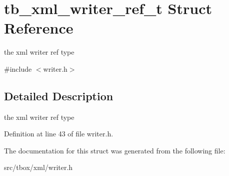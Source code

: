 \hypertarget{structtb__xml__writer__ref__t}{\section{tb\-\_\-xml\-\_\-writer\-\_\-ref\-\_\-t Struct Reference}
\label{structtb__xml__writer__ref__t}
}


the xml writer ref type  




{\ttfamily \#include $<$writer.\-h$>$}



\subsection{Detailed Description}
the xml writer ref type 

Definition at line 43 of file writer.\-h.



The documentation for this struct was generated from the following file\-:\begin{DoxyCompactItemize}
\item 
src/tbox/xml/writer.\-h\end{DoxyCompactItemize}
